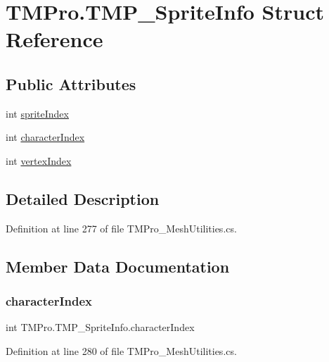 \hypertarget{struct_t_m_pro_1_1_t_m_p___sprite_info}{}\section{T\+M\+Pro.\+T\+M\+P\+\_\+\+Sprite\+Info Struct Reference}
\label{struct_t_m_pro_1_1_t_m_p___sprite_info}
\subsection*{Public Attributes}
\begin{DoxyCompactItemize}
\item 
int \mbox{\hyperlink{struct_t_m_pro_1_1_t_m_p___sprite_info_a6e2e5b20f244937cb1a1f8a2218e1b21}{sprite\+Index}}
\item 
int \mbox{\hyperlink{struct_t_m_pro_1_1_t_m_p___sprite_info_ae4b846cc02670b6e459df902f79b2cc8}{character\+Index}}
\item 
int \mbox{\hyperlink{struct_t_m_pro_1_1_t_m_p___sprite_info_a65f40aee8fe65bad773cbfb32552054f}{vertex\+Index}}
\end{DoxyCompactItemize}


\subsection{Detailed Description}


Definition at line 277 of file T\+M\+Pro\+\_\+\+Mesh\+Utilities.\+cs.



\subsection{Member Data Documentation}
\mbox{\label{struct_t_m_pro_1_1_t_m_p___sprite_info_ae4b846cc02670b6e459df902f79b2cc8}} 
\subsubsection{\texorpdfstring{characterIndex}{characterIndex}}
{\footnotesize\ttfamily int T\+M\+Pro.\+T\+M\+P\+\_\+\+Sprite\+Info.\+character\+Index}



Definition at line 280 of file T\+M\+Pro\+\_\+\+Mesh\+Utilities.\+cs.

